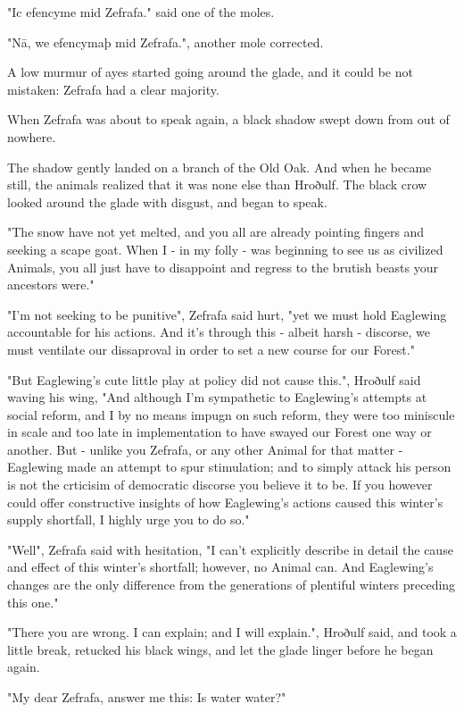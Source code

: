 "Ic efencyme mid Zefrafa." said one of the moles.

"Nā, we efencymaþ mid Zefrafa.", another mole corrected.

A low murmur of ayes started going around the glade, and it could be not mistaken: Zefrafa had a clear majority.

When Zefrafa was about to speak again, a black shadow swept down from out of nowhere. 

The shadow gently landed on a branch of the Old Oak. And when he became still, the animals realized that it was none else than Hroðulf. The black crow looked around the glade with disgust, and began to speak.

"The snow have not yet melted, and you all are already pointing fingers and seeking a scape goat. When I - in my folly - was beginning to see us as civilized Animals, you all just have to disappoint and regress to the brutish beasts your ancestors were."

"I'm not seeking to be punitive", Zefrafa said hurt, "yet we must hold Eaglewing accountable for his actions. And it's through this - albeit harsh - discorse, we must ventilate our dissaproval in order to set a new course for our Forest."

"But Eaglewing's cute little play at policy did not cause this.", Hroðulf said waving his wing, "And although I'm sympathetic to Eaglewing's attempts at social reform, and I by no means impugn on such reform, they were too miniscule in scale and too late in implementation to have swayed our Forest one way or another. But - unlike you Zefrafa, or any other Animal for that matter - Eaglewing made an attempt to spur stimulation; and to simply attack his person is not the crticisim of democratic discorse you believe it to be. If you however could offer constructive insights of how Eaglewing's actions caused this winter's supply shortfall, I highly urge you to do so."

"Well", Zefrafa said with hesitation, "I can't explicitly describe in detail the cause and effect of this winter's shortfall; however, no Animal can. And Eaglewing's changes are the only difference from the generations of plentiful winters preceding this one."

"There you are wrong. I can explain; and I will explain.", Hroðulf said, and took a little break, retucked his black wings, and let the glade linger before he began again.

"My dear Zefrafa, answer me this: Is water water?"

